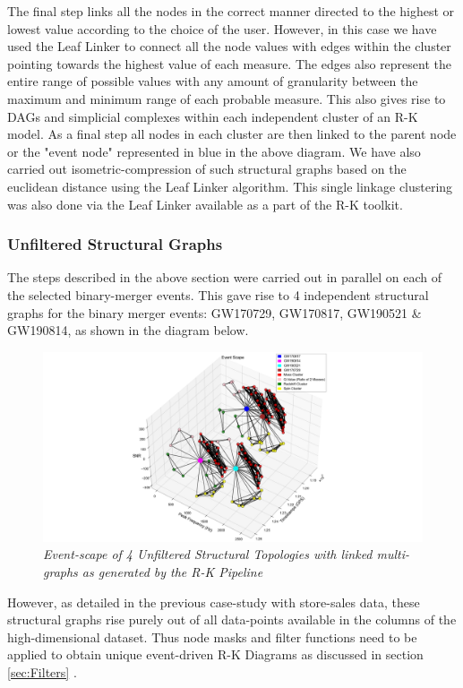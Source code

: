 The final step links all the nodes in the correct manner directed to the highest or lowest value according to the choice of the user. However, in this case we have used the Leaf Linker to connect all the node values with edges within the cluster pointing towards the highest value of each measure. The edges also represent the entire range of possible values with any amount of granularity between the maximum and minimum range of each probable measure. This also gives rise to DAGs and simplicial complexes within each independent cluster of an R-K model. As a final step all nodes in each cluster are then linked to the parent node or the "event node" represented in blue in the above diagram. We have also carried out isometric-compression of such structural graphs based on the euclidean distance using the Leaf Linker algorithm. This single linkage clustering was also done via the Leaf Linker available as a part of the R-K toolkit.

\subsubsection{Unfiltered Structural Graphs}


The steps described in the above section were carried out in parallel on each of the selected binary-merger events. This gave rise to 4 independent structural graphs for the binary merger events:  GW170729, GW170817, GW190521 \& GW190814, as shown in the diagram below.

    \begin{figure}[H]
        \centering
        \includegraphics[width=1.0\linewidth]{images/70_26_EventScape of 4 RK Diagrams without Threshold Filters 2.png}
        \caption{\textit{Event-scape of 4  Unfiltered Structural Topologies with linked multi-graphs as generated by the R-K Pipeline}}
        \label{fig:LIGO12_PlaceHolder_fig}
    \end{figure}
However, as detailed in the previous case-study with store-sales data, these structural graphs rise purely out of all data-points available in the columns of the high-dimensional dataset. Thus node masks and filter functions need to be applied to obtain unique event-driven R-K Diagrams as discussed in section \ref{sec:Filters} .

